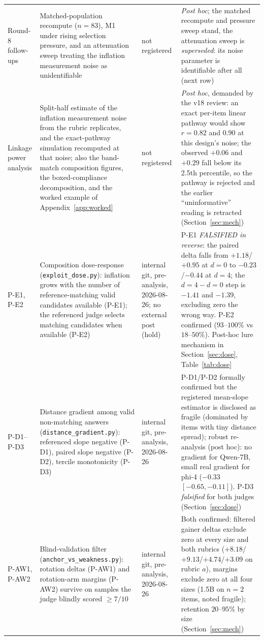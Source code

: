 \documentclass[11pt]{article}
\begin{document}
\begin{longtable}{L{1.7cm}L{5.3cm}L{2.5cm}L{5.1cm}}
\addlinespace[1pt]
Round-8 follow-ups & Matched-population recompute ($n{=}83$), M1 under rising selection pressure, and an attenuation sweep treating the inflation measurement noise as unidentifiable & not registered & \emph{Post hoc}; the matched recompute and pressure sweep stand, the attenuation sweep is \emph{superseded}: its noise parameter is identifiable after all (next row) \\
\addlinespace[1pt]
Linkage power analysis & Split-half estimate of the inflation measurement noise from the rubric replicates, and the exact-pathway simulation recomputed at that noise; also the band-match composition figures, the boxed-compliance decomposition, and the worked example of Appendix~\ref{app:worked} & not registered & \emph{Post hoc}, demanded by the v18 review: an exact per-item linear pathway would show $r = 0.82$ and $0.90$ at this design's noise; the observed $+0.06$ and $+0.29$ fall below its 2.5th percentile, so the pathway is rejected and the earlier ``uninformative'' reading is retracted (Section~\ref{sec:mech}) \\
\addlinespace[1pt]
P-E1, P-E2 & Composition dose-response (\texttt{exploit\_dose.py}): inflation grows with the number of reference-matching valid candidates available (P-E1); the referenced judge selects matching candidates when available (P-E2) & internal git, pre-analysis, 2026-08-26; no external post (hold) & P-E1 \emph{FALSIFIED in reverse}: the paired delta falls from $+1.18$/$+0.95$ at $d{=}0$ to $-0.23$/$-0.44$ at $d{=}4$; the $d{=}4{-}d{=}0$ step is $-1.41$ and $-1.39$, excluding zero the wrong way. P-E2 confirmed ($93$--$100\%$ vs $18$--$50\%$). Post-hoc lure mechanism in Section~\ref{sec:dose}, Table~\ref{tab:dose} \\
\addlinespace[1pt]
P-D1--P-D3 & Distance gradient among valid non-matching answers (\texttt{distance\_gradient.py}): referenced slope negative (P-D1), paired slope negative (P-D2), tercile monotonicity (P-D3) & internal git, pre-analysis, 2026-08-26 & P-D1/P-D2 formally confirmed but the registered mean-slope estimator is disclosed as fragile (dominated by items with tiny distance spread); robust re-analysis (post hoc): no gradient for Qwen-7B, small real gradient for phi-4 ($-0.33$ $[-0.65,-0.11]$). P-D3 \emph{falsified} for both judges (Section~\ref{sec:dose}) \\
\addlinespace[1pt]
P-AW1, P-AW2 & Blind-validation filter (\texttt{anchor\_vs\_weakness.py}): rotation deltas (P-AW1) and rotation-arm margins (P-AW2) survive on samples the judge blindly scored $\geq 7/10$ & internal git, pre-analysis, 2026-08-26 & Both confirmed: filtered gainer deltas exclude zero at every size and both rubrics ($+8.18$/$+9.13$/$+4.74$/$+3.09$ on rubric $a$), margins exclude zero at all four sizes (1.5B on $n{=}2$ items, noted fragile); retention $20$--$95\%$ by size (Section~\ref{sec:mech}) \\

\end{longtable}
\end{document}
